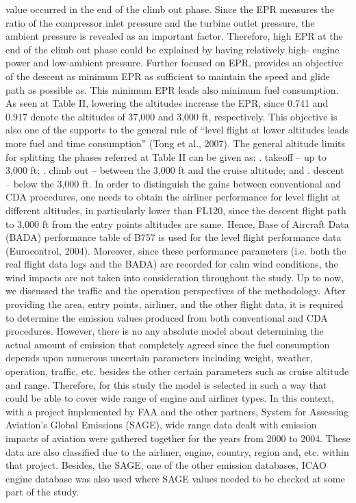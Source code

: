 \documentclass{aer1315-pretty}
\begin{document}
\begin{itemize}
value occurred in the end of the climb out phase. Since the
EPR measures the ratio of the compressor inlet pressure and
the turbine outlet pressure, the ambient pressure is revealed as
an important factor. Therefore, high EPR at the end of the
climb out phase could be explained by having relatively high-
engine power and low-ambient pressure. Further focused on
EPR, provides an objective of the descent as minimum EPR
as sufficient to maintain the speed and glide path as possible
as. This minimum EPR leads also minimum fuel
consumption. As seen at Table II, lowering the altitudes
increase the EPR, since 0.741 and 0.917 denote the altitudes
of 37,000 and 3,000 ft, respectively. This objective is also one
of the supports to the general rule of “level flight at lower
altitudes leads more fuel and time consumption” (Tong et al.,
2007).
   The general altitude limits for splitting the phases referred
at Table II can be given as:
.
     takeoff – up to 3,000 ft;
.    climb out – between the 3,000 ft and the cruise altitude;
     and
.
     descent – below the 3,000 ft.
In order to distinguish the gains between conventional and
CDA procedures, one needs to obtain the airliner
performance for level flight at different altitudes, in
particularly lower than FL120, since the descent flight path
to 3,000 ft from the entry points altitudes are same. Hence,
Base of Aircraft Data (BADA) performance table of B757
is used for the level flight performance data (Eurocontrol,
2004). Moreover, since these performance parameters
(i.e. both the real flight data logs and the BADA) are
recorded for calm wind conditions, the wind impacts are not
taken into consideration throughout the study.
   Up to now, we discussed the traffic and the operation
perspectives of the methodology. After providing the area,
entry points, airliner, and the other flight data, it is required to
determine the emission values produced from both
conventional and CDA procedures. However, there is no any
absolute model about determining the actual amount of
emission that completely agreed since the fuel consumption
depends upon numerous uncertain parameters including
weight, weather, operation, traffic, etc. besides the other
certain parameters such as cruise altitude and range.
Therefore, for this study the model is selected in such a way
that could be able to cover wide range of engine and airliner
types.
   In this context, with a project implemented by FAA and the
other partners, System for Assessing Aviation’s Global
Emissions (SAGE), wide range data dealt with emission
impacts of aviation were gathered together for the years from
2000 to 2004. These data are also classified due to the
airliner, engine, country, region and, etc. within that project.
Besides, the SAGE, one of the other emission databases,
ICAO engine database was also used where SAGE values
needed to be checked at some part of the study.



\end{itemize}
\end{document}
